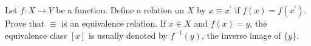 \begin{questions}
\begin{solution}
    
\end{solution}


\question
    Let \(f: X \rightarrow Y\) be a function. Define a relation on \(X\) by \(x \equiv x^{\prime}\) if \(f(x)=f\left(x^{\prime}\right)\). Prove that \(\equiv\) is an equivalence relation. If \(x \in X\) and \(f(x)=y\), the equivalence class \([x]\) is usually denoted by \(f^{-1}(y)\), the inverse image of \(\{y\}\).

\begin{solution}
    
\end{solution}
\end{questions}